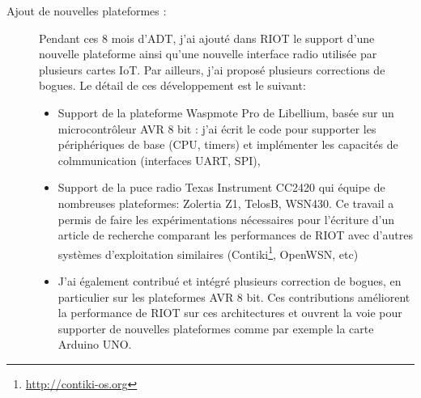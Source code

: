 \documentclass[a4paper, twoside]{article}
\begin{document}
\begin{description}
    \item[Ajout de nouvelles plateformes :] Pendant ces 8 mois d'ADT, j'ai 
        ajouté dans RIOT le support d'une nouvelle plateforme ainsi qu'une 
        nouvelle interface radio utilisée par plusieurs cartes IoT. Par 
        ailleurs, j'ai proposé plusieurs corrections de bogues. Le détail de 
        ces développement est le suivant:
        \begin{itemize}
            \item Support de la plateforme Waspmote Pro de Libellium, basée 
                sur un microcontrôleur AVR 8 bit : j'ai écrit le code pour 
                supporter les périphériques de base (CPU, timers) et 
                implémenter les capacités de colmmunication (interfaces UART,
                SPI),

            \item Support de la puce radio Texas Instrument CC2420 qui équipe de 
                nombreuses plateformes: Zolertia Z1, TelosB, WSN430. Ce travail a permis de
                faire les expérimentations nécessaires pour l'écriture d'un article de 
                recherche comparant les performances de RIOT avec d'autres systèmes
                d'exploitation similaires (Contiki\footnote{\url{http://contiki-os.org}},
                OpenWSN, etc)
            \item J'ai également contribué et intégré plusieurs correction de bogues, en
                  particulier sur les plateformes AVR 8 bit. Ces contributions améliorent la
                  performance de RIOT sur ces architectures et ouvrent la voie pour
                  supporter de nouvelles plateformes comme par exemple la carte Arduino UNO.
        \end{itemize}


\end{description}
\end{document}
